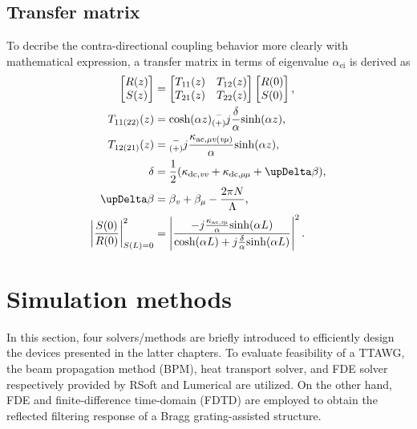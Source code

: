 \subsection{Transfer matrix } \label{sec:2.3.2}
    To decribe the contra-directional coupling behavior more clearly with mathematical expression, 
    a transfer matrix in terms of eigenvalue $\alpha_\text{ei}$ is derived as 
    \begin{align}
        \begin{bmatrix}
            R(z) \\
            S(z)
        \end{bmatrix} &= 
        \begin{bmatrix}
            T_\text{11}(z) & T_\text{12}(z) \\
            T_\text{21}(z) & T_\text{22}(z)
        \end{bmatrix}
        \begin{bmatrix}
            R(0) \\
            S(0)
        \end{bmatrix}\text{,}\label{eqCMT:5}\\
        T_\text{11(22)}(z) &= \text{cosh}(\alpha z){\substack{-\\(+)}} j\frac{\delta}{\alpha}\text{sinh}(\alpha z)\text{,}\label{eqCMT:6}\\
        T_\text{12(21)}(z) &= {\substack{-\\(+)}} j\frac{\kappa_\text{ac,\textit{\textmu v}(\textit{v\textmu})}}
        {\alpha}\text{sinh}(\alpha z)\text{,}\label{eqCMT:7}\\
        \delta &= \frac{1}{2}(\kappa_\text{dc,\textit{vv}} + 
                \kappa_\text{dc,\textit{\textmu \textmu}} + \upDelta \beta)\text{,}\label{eqCMT:8}\\
        \upDelta \beta &= \beta_\text{\textit{v}} + \beta_\text{\textit{\textmu}} - \frac{2\pi N}{\Lambda}\text{,}\label{eqCMT:9}\\
        \left|\frac{S(0)}{R(0)}\right|_{S(L)=0}^2 &= \left|\frac{-j\frac{\kappa_\text{ac,\textit{v\textmu}}}{\alpha}\text{sinh}(\alpha L)}
                {\text{cosh}(\alpha L)+j\frac{\delta}{\alpha}\text{sinh}(\alpha L)}\right|^2\text{.}\label{eqCMT:10}
    \end{align}
    \lipsum

\section{Simulation methods} \label{sec:2.4}
    In this section, four solvers/methods are briefly introduced to efficiently design the devices presented in the latter chapters. 
    To evaluate feasibility of a TTAWG, 
    the beam propagation method (BPM), heat transport solver, and FDE solver respectively provided by 
    RSoft and Lumerical are utilized. 
    On the other hand, 
    FDE and finite-difference time-domain (FDTD) are employed to obtain the reflected filtering response of a Bragg grating-assisted structure. 

